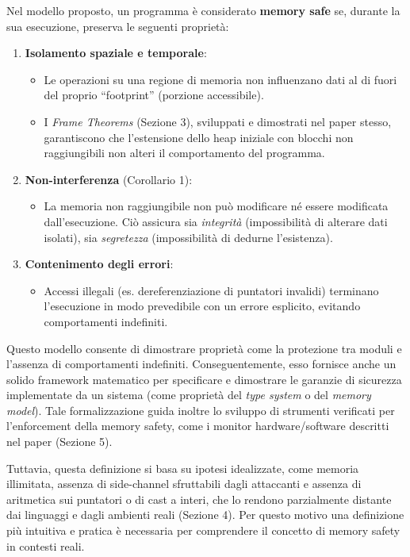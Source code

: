 Nel modello proposto, un programma è considerato \textbf{memory safe} se, durante
la sua esecuzione, preserva le seguenti proprietà:
\begin{enumerate}
  \item \textbf{Isolamento spaziale e temporale}:
    \begin{itemize}
      \item Le operazioni su una regione di memoria non influenzano dati al di fuori
        del proprio ``footprint'' (porzione accessibile).

      \item I \textit{Frame Theorems} (Sezione 3), sviluppati e dimostrati nel paper
        stesso, garantiscono che l'estensione dello heap iniziale con blocchi
        non raggiungibili non alteri il comportamento del programma.
    \end{itemize}

  \item \textbf{Non-interferenza} (Corollario 1):
    \begin{itemize}
      \item La memoria non raggiungibile non può modificare né essere modificata
        dall'esecuzione. Ciò assicura sia \textit{integrità} (impossibilità di
        alterare dati isolati), sia \textit{segretezza} (impossibilità di
        dedurne l'esistenza).
    \end{itemize}

  \item \textbf{Contenimento degli errori}:
    \begin{itemize}
      \item Accessi illegali (es. dereferenziazione di puntatori invalidi)
        terminano l'esecuzione in modo prevedibile con un errore esplicito, evitando
        comportamenti indefiniti.
    \end{itemize}
\end{enumerate}

Questo modello consente di dimostrare proprietà come la protezione tra moduli e
l'assenza di comportamenti indefiniti. Conseguentemente, esso fornisce anche un
solido framework matematico per specificare e dimostrare le garanzie di
sicurezza implementate da un sistema (come proprietà del \textit{type system} o
del \textit{memory model}). Tale formalizzazione guida inoltre lo sviluppo di strumenti
verificati per l'enforcement della memory safety, come i monitor hardware/software
descritti nel paper (Sezione 5).

Tuttavia, questa definizione si basa su ipotesi idealizzate, come memoria
illimitata, assenza di side-channel sfruttabili dagli attaccanti e assenza di aritmetica
sui puntatori o di cast a interi, che lo rendono parzialmente distante dai
linguaggi e dagli ambienti reali (Sezione 4). Per questo motivo una definizione più
intuitiva e pratica è necessaria per comprendere il concetto di memory safety in
contesti reali.

